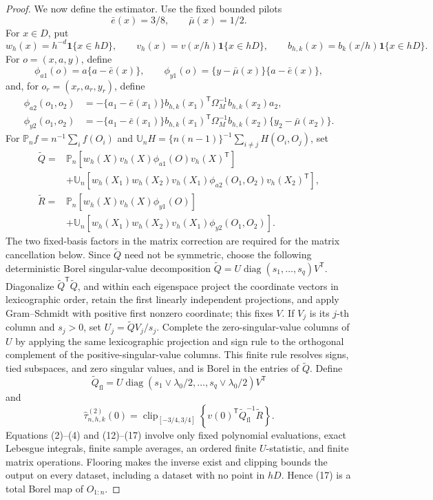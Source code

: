 \documentclass{article}
\begin{document}
\begin{proof}
We now define the estimator.  Use the fixed bounded pilots
\[
 \bar e(x)=3/8,
 \qquad \bar\mu(x)=1/2.
 \tag{12}
\]
For \(x\in D\), put
\[
 w_h(x)=h^{-d}\mathbf1\{x\in hD\},\qquad
 v_h(x)=v(x/h)\mathbf1\{x\in hD\},\qquad
 b_{h,k}(x)=b_k(x/h)\mathbf1\{x\in hD\}.
\]
For \(o=(x,a,y)\), define
\[
 \phi_{a1}(o)=a\{a-\bar e(x)\},
 \qquad
 \phi_{y1}(o)=\{y-\bar\mu(x)\}\{a-\bar e(x)\},
 \tag{13}
\]
and, for \(o_r=(x_r,a_r,y_r)\), define
\[
 \begin{split}
 \phi_{a2}(o_1,o_2)
 &=-\{a_1-\bar e(x_1)\}
 b_{h,k}(x_1)^{\mathsf T}\Omega_M^{-1}b_{h,k}(x_2)a_2,\\
 \phi_{y2}(o_1,o_2)
 &=-\{a_1-\bar e(x_1)\}
 b_{h,k}(x_1)^{\mathsf T}\Omega_M^{-1}b_{h,k}(x_2)
 \{y_2-\bar\mu(x_2)\}.
 \end{split}
 \tag{14}
\]
For \(\mathbb P_nf=n^{-1}\sum_i f(O_i)\) and \(\mathbb U_nH=\{n(n-1)\}^{-1}\sum_{i\ne j}H(O_i,O_j)\), set
\[
 \begin{split}
 \widetilde Q={}&\mathbb P_n\!\left[
 w_h(X)v_h(X)\phi_{a1}(O)v_h(X)^{\mathsf T}\right]\\
 &+\mathbb U_n\!\left[
 w_h(X_1)w_h(X_2)v_h(X_1)\phi_{a2}(O_1,O_2)v_h(X_2)^{\mathsf T}\right],\\
 \widetilde R={}&\mathbb P_n\!\left[
 w_h(X)v_h(X)\phi_{y1}(O)\right]\\
 &+\mathbb U_n\!\left[
 w_h(X_1)w_h(X_2)v_h(X_1)\phi_{y2}(O_1,O_2)\right].
 \end{split}
 \tag{15}
\]
The two fixed-basis factors in the matrix correction are required for the matrix cancellation below.  Since \(\widetilde Q\) need not be symmetric, choose the following deterministic Borel singular-value decomposition \(\widetilde Q=U\operatorname{diag}(s_1,\ldots,s_q)V^{\mathsf T}\).  Diagonalize \(\widetilde Q^{\mathsf T}\widetilde Q\), and within each eigenspace project the coordinate vectors in lexicographic order, retain the first linearly independent projections, and apply Gram--Schmidt with positive first nonzero coordinate; this fixes \(V\).  If \(V_j\) is its \(j\)-th column and \(s_j>0\), set \(U_j=\widetilde QV_j/s_j\).  Complete the zero-singular-value columns of \(U\) by applying the same lexicographic projection and sign rule to the orthogonal complement of the positive-singular-value columns.  This finite rule resolves signs, tied subspaces, and zero singular values, and is Borel in the entries of \(\widetilde Q\).  Define
\[
 \widetilde Q_{\mathrm{fl}}
 =U\operatorname{diag}(s_1\vee\lambda_0/2,\ldots,s_q\vee\lambda_0/2)V^{\mathsf T}
 \tag{16}
\]
and
\[
 \widehat\tau^{(2)}_{n,h,k}(0)
 =\operatorname{clip}_{[-3/4,3/4]}
 \left\{v(0)^{\mathsf T}\widetilde Q_{\mathrm{fl}}^{-1}\widetilde R\right\}.
 \tag{17}
\]
Equations (2)--(4) and (12)--(17) involve only fixed polynomial evaluations, exact Lebesgue integrals, finite sample averages, an ordered finite \(U\)-statistic, and finite matrix operations.  Flooring makes the inverse exist and clipping bounds the output on every dataset, including a dataset with no point in \(hD\).  Hence (17) is a total Borel map of \(O_{1:n}\).


\end{proof}
\end{document}
